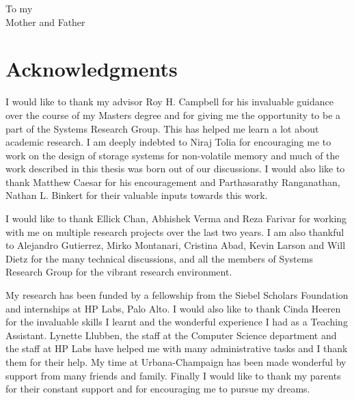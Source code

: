 \documentclass[edeposit,10pt,fullpage]{uiucthesis2009}
\begin{document}
\begin{dedication}
To my\\
Mother and Father
\end{dedication}

\chapter*{Acknowledgments}

I would like to thank my advisor Roy H. Campbell for his
invaluable guidance over the course of my Masters degree and for giving me
the opportunity to be a part of the Systems Research Group. This has helped
me learn a lot about academic research.  I am deeply indebted to Niraj
Tolia for encouraging me to work on the design of storage systems for
non-volatile memory and much of the work described in this thesis was
born out of our discussions. I would also like to thank Matthew Caesar for
his encouragement and Parthasarathy Ranganathan, Nathan L. Binkert
for their valuable inputs towards this work.

I would like to thank Ellick Chan, Abhishek Verma and Reza Farivar for working
with me on multiple research projects over the last two years. I am also thankful to 
Alejandro Gutierrez, Mirko Montanari, Cristina Abad, Kevin Larson and Will Dietz
for the many technical discussions, and all the members of Systems Research Group
for the vibrant research environment.

My research has been funded by a fellowship from the Siebel Scholars Foundation
and internships at HP Labs, Palo Alto. I would also like to thank Cinda Heeren
for the invaluable skills I learnt and the wonderful experience I had as a
Teaching Assistant. Lynette Llubben, the staff at the Computer Science
department and the staff at HP Labs have helped me with many administrative
tasks and I thank them for their help.  My time at Urbana-Champaign has been
made wonderful by support from many friends and family. Finally I would like to
thank my parents for their constant support and for encouraging me to
pursue my dreams.

\end{document}
